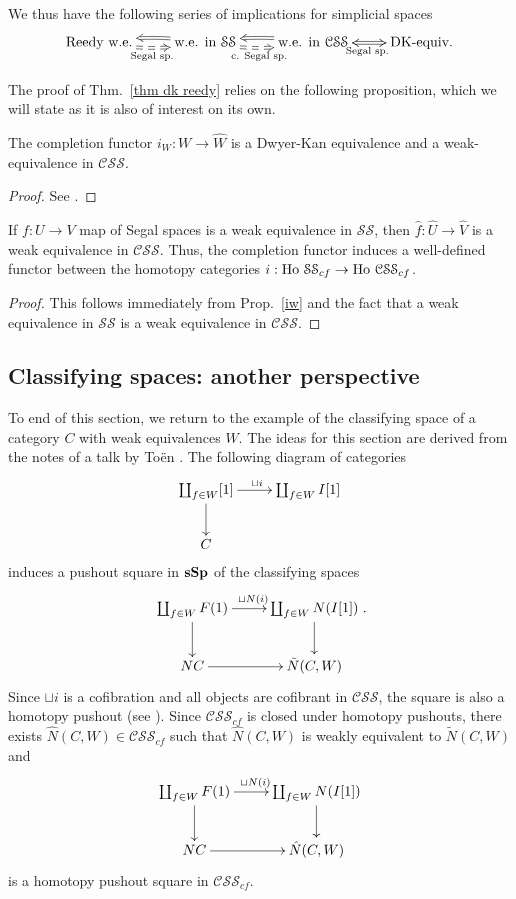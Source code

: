 \begin{refsection}
We thus have the following series of implications for simplicial spaces
$$\xymatrix{\text{Reedy w.e.}\ar@{==>}@/_.3pc/[r]_{\text{Segal sp.}}&\text{w.e. in }\mathcal{SS}\ar@{==>}@/_.3pc/[r]_{\text{c. Segal sp.}}\ar@{=>}@/_.3pc/[l]&\text{w.e. in }\mathcal{CSS}\ar@{<=>}[r]_{\text{Segal sp.}}\ar@{=>}@/_.3pc/[l]&\text{DK-equiv.}}$$

The proof of Thm.~\ref{thm dk reedy} relies on the following proposition, which we will state as it is also of interest on its own.
\begin{prop}\label{iw}
The completion functor $i_W:W\to\widehat W$ is a Dwyer-Kan equivalence and a weak-equivalence in $\mathcal{CSS}$.
\end{prop}
\begin{proof}
See \cite[Sec.~14]{rezk}.
\end{proof}

\begin{cor}
If $f:U\to V$ map of Segal spaces is a weak equivalence in $\mathcal{SS}$, then $\hat f:\hat U\to\hat V$ is a weak equivalence in $\mathcal{CSS}$. Thus, the completion functor induces a well-defined functor between the homotopy categories $i:\operatorname{\mathrm{Ho} \,}\mathcal{SS}_{cf}\to\operatorname{\mathrm{Ho} \,}\mathcal{CSS}_{cf}$.
\end{cor}
\begin{proof}
This follows immediately from Prop.~\ref{iw} and the fact that a weak equivalence in $\mathcal{SS}$ is a weak equivalence in $\mathcal{CSS}$.
\end{proof}

\subsection{Classifying spaces: another perspective}\label{sslocal}
To end of this section, we return to the example of the classifying space of a category $C$ with weak equivalences $W$. The ideas for this section are derived from the notes of a talk by To\"en \cite{toentalksegal}. The following diagram of categories
\begin{equation} \label{seglocalpushout}
\xymatrix{\coprod_{f\in W}[1]\ar[r]^{\sqcup i}\ar[d]&\coprod_{f\in W}I[1]\\C}
\end{equation}
induces a pushout square in $\mathbf{sSp}$ of the classifying spaces
\[
\xymatrix{
\coprod_{f \in W} F(1)\ar[r]^{\sqcup N(i)}\ar[d] & \coprod_{f\in W} N(I[1]) \ar[d] \\ NC\ar[r]&\tilde N(C,W)
}.
\]
Since $\sqcup i$ is a cofibration and all objects are cofibrant in $\mathcal{CSS}$, the square is also a homotopy pushout (see \cite[Prop A.2.2.4]{htt}). Since $\mathcal{CSS}_{cf}$ is closed under homotopy pushouts, there exists $\hat N(C,W)\in\mathcal{CSS}_{cf}$ such that $\hat N(C,W)$ is weakly equivalent to $\tilde N(C,W)$ and
$$\xymatrix{\coprod_{f\in W}F(1)\ar[r]^{\sqcup N(i)}\ar[d]&\coprod_{f\in W}N(I[1])\ar[d]\\NC\ar[r]&\hat N(C,W)}$$
is a homotopy pushout square in $\mathcal{CSS}_{cf}$.


\end{refsection}
